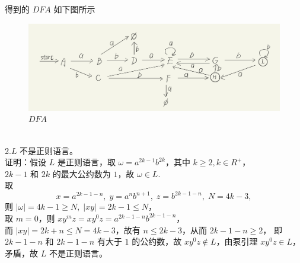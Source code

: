 \documentclass{article}
\begin{document}
\newpage
得到的 $DFA$ 如下图所示
\begin{figure}[htbp]
	\centering
    \includegraphics[width=43em,height=!]{NFA2.jpg}
	\caption{$DFA$}
\end{figure}
\\
2.$L$ 不是正则语言。\\
证明：假设 $L$ 是正则语言，取 $\omega = a^{2k - 1}b^{2k}$，其中 $k \geq 2, k \in R^{+}$，\\
$2k - 1$ 和 $2k$ 的最大公约数为 $1$，故 $\omega \in L$. \\
取 
\[
    x = a^{2k - 1 - n},\; y = a^{n} b^{n + 1},\; z = b^{2k - 1 - n},\; N = 4k - 3,
\]
则 $|\omega| = 4k - 1 \geq N,\; |xy| = 2k - 1 \leq N $， \\
取 $m = 0$，则 $xy^{m}z = xy^{0}z = a^{2k - 1 - n}b^{2k - 1 - n}$，\\
而 $|xy| = 2k + n \leq N = 4k - 3$，故有 $n \leq 2k - 3$，从而 $2k - 1 - n \geq 2$，
即 $2k - 1 - n$ 和 $2k - 1 -n$ 有大于 $1$ 的公约数，故 $xy^{0}z \notin L$，由泵引理 $xy^{0}z \in L$，矛盾，故 $L$ 不是正则语言。\\
\end{document}
